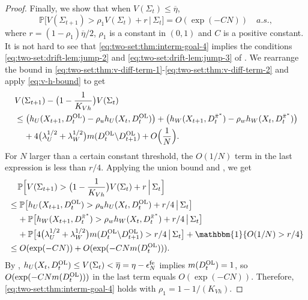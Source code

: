 \documentclass[11pt,letterpaper]{article}
\theoremstyle{plain}
\theoremstyle{definition}
\theoremstyle{remark}
\newcommand{\givenbig}{\,\big|\,}
\newcommand{\givenBig}{\,\Big|\,}
\newcommand{\Probbig}[1]{\mathbb{P}\big[#1\big]}
\newcommand{\ProbBig}[1]{\mathbb{P}\Big[#1\Big]}
\newcommand{\indibrac}[1]{\mathbbm{1}\!\left\{#1\right\}}
\newcommand{\pibar}{{\sysbar{\pi}}}
\newcommand{\pibs}{{\pibar^*}}
\newcommand{\sysbar}[1]{\bar{#1}}
\newcommand{\threshbar}{\overline{\eta}}
\newcommand{\wmat}{W}
\newcommand{\umat}{U}
\newcommand{\rhoFinal}{\rho_1}
\newcommand{\errfe}{\epsilon_N^{\text{fe}}}
\newcommand{\hw}{h_\wmat}
\newcommand{\hu}{h_\umat}
\newcommand{\lamw}{\lambda_\wmat}
\newcommand{\lamu}{\lambda_\umat}
\newcommand{\rhow}{\rho_{w}}
\newcommand{\rhou}{\rho_{u}}
\newcommand{\Da}{D^{\pibs}}
\newcommand{\Db}{D^{\textup{OL}}}
\newcommand{\Fullstate}{\Sigma}
\begin{document}
\begin{proof}
Finally, we show that when $V(\Fullstate_t) \leq \threshbar$, 
\begin{equation}
     \label{eq:two-set:thm:interm-goal-4}
    \Probbig{V(\Fullstate_{t+1}) > \rhoFinal V(\Fullstate_t) + r \givenbig \Fullstate_t} = O(\exp(-CN)) \quad a.s., 
\end{equation}
where $r = (1-\rhoFinal)\threshbar / 2$, $\rhoFinal$ is a constant in $(0,1)$ and $C$ is a positive constant. It is not hard to see that \eqref{eq:two-set:thm:interm-goal-4} implies the conditions \eqref{eq:two-set:drift-lem:jump-2} and \eqref{eq:two-set:drift-lem:jump-3} of .  
We rearrange the bound in \eqref{eq:two-set:thm:v-diff-term-1}-\eqref{eq:two-set:thm:v-diff-term-2} and apply \eqref{eq:v-h-bound} to get 
\begin{align*}
    \nonumber
    & V(\Fullstate_{t+1}) - \big(1-\frac{1}{K_{Vh}}\big) V(\Fullstate_t) \\
    &\leq \big(\hu(X_{t+1}, \Db_t) - \rhou \hu(X_{t}, \Db_t)\big)+ \big(\hw(X_{t+1}, \Da_t) - \rhow\hw(X_{t}, \Da_t)\big)\\
    &\mspace{20mu} + 4\big(\lamu^{1/2} + \lamw^{1/2}\big) m(\Db_t \backslash \Db_{t+1}) + O\Big(\frac{1}{N}\Big). 
\end{align*}
For $N$ larger than a certain constant threshold, the $O(1/N)$ term in the last expression is less than $r/4$. 
Applying the union bound and , we get
\begin{align*}
    &\mspace{20mu} \ProbBig{V(\Fullstate_{t+1}) > \big(1-\frac{1}{K_{Vh}}\big) V(\Fullstate_t) + r\givenBig \Fullstate_t} \\
    &\leq \Probbig{\hu(X_{t+1}, \Db_t) > \rhou \hu(X_{t}, \Db_t) + r/4 \givenbig \Fullstate_t} \\
    &\mspace{20mu} + \Probbig{\hw(X_{t+1}, \Da_t) > \rhow \hw(X_{t}, \Da_t) + r/4 \givenbig \Fullstate_t} \\
    &\mspace{20mu} + \Probbig{4\big(\lamu^{1/2} + \lamw^{1/2}\big) m(\Db_t \backslash \Db_{t+1})  > r/4 \givenbig \Fullstate_t} + \indibrac{O(1/N) > r/4} \\
    &\leq O(\exp(-CN)) + O(\exp(-CN m(\Db_t))). 
\end{align*}
By , $\hu(X_t, \Db_t) \leq V(\Fullstate_t) < \threshbar = \eta-\errfe$ implies $m(\Db_t) =1$, so $O(\exp(-CN m(\Db_t)))$ in the last term equals $O(\exp(-CN))$. 
Therefore,  \eqref{eq:two-set:thm:interm-goal-4} holds with $\rhoFinal = 1 - 1/(K_{Vh})$. 
\end{proof}
\end{document}
